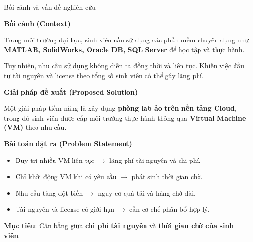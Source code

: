 
\begin{frame}{Bối cảnh và vấn đề nghiên cứu}

\small

\textbf{\color{HCMUTBlue}Bối cảnh (Context)}

\vspace{0.15cm}

Trong môi trường đại học, sinh viên cần sử dụng các
phần mềm chuyên dụng như \textbf{MATLAB, SolidWorks,
Oracle DB, SQL Server} để học tập và thực hành.


Tuy nhiên, nhu cầu sử dụng không diễn ra đồng thời
và liên tục. Khiến việc đầu tư tài nguyên và license
theo tổng số sinh viên có thể gây lãng phí.

\vspace{0.35cm}

\textbf{\color{HCMUTBlue}Giải pháp đề xuất (Proposed Solution)}

\vspace{0.15cm}

Một giải pháp tiềm năng là xây dựng
\textbf{phòng lab ảo trên nền tảng Cloud},
trong đó sinh viên được cấp môi trường thực hành
thông qua \textbf{Virtual Machine (VM)} theo nhu cầu.

\vspace{0.35cm}

\textbf{\color{HCMUTBlue}Bài toán đặt ra (Problem Statement)}

\vspace{0.1cm}

\begin{itemize}
  \setlength{\itemsep}{0.45em}

  \item Duy trì nhiều VM liên tục
  $\rightarrow$ lãng phí tài nguyên và chi phí.

  \item Chỉ khởi động VM khi có yêu cầu
  $\rightarrow$ phát sinh thời gian chờ.

  \item Nhu cầu tăng đột biến
  $\rightarrow$ nguy cơ quá tải và hàng chờ dài.

  \item Tài nguyên và license có giới hạn
  $\rightarrow$ cần cơ chế phân bổ hợp lý.
\end{itemize}

\vfill

\begin{center}
  \color{HCMUTBlue}
  \textbf{Mục tiêu:}
  Cân bằng giữa \textbf{chi phí tài nguyên}
  và \textbf{thời gian chờ của sinh viên}.
\end{center}

\end{frame}
